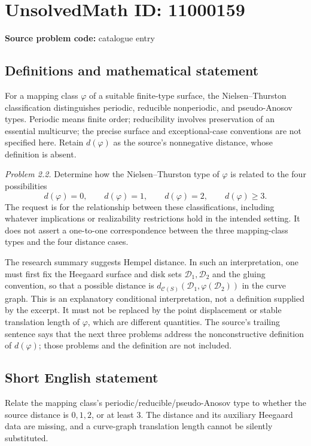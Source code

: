 \documentclass[11pt]{article}
\begin{document}
\section*{UnsolvedMath ID: 11000159}
\textbf{Source problem code:} catalogue entry
\subsection{Definitions and mathematical statement}
For a mapping class \(\varphi\) of a suitable finite-type surface, the Nielsen--Thurston classification distinguishes periodic, reducible nonperiodic, and pseudo-Anosov types. Periodic means finite order; reducibility involves preservation of an essential multicurve; the precise surface and exceptional-case conventions are not specified here. Retain \(d(\varphi)\) as the source's nonnegative distance, whose definition is absent.

\emph{Problem 2.2.} Determine how the Nielsen--Thurston type of \(\varphi\) is related to the four possibilities
\[
 d(\varphi)=0,\qquad d(\varphi)=1,\qquad
 d(\varphi)=2,\qquad d(\varphi)\geq3.
\]
The request is for the relationship between these classifications, including whatever implications or realizability restrictions hold in the intended setting. It does not assert a one-to-one correspondence between the three mapping-class types and the four distance cases.

The research summary suggests Hempel distance. In such an interpretation, one must first fix the Heegaard surface and disk sets \(\mathcal D_1,\mathcal D_2\) and the gluing convention, so that a possible distance is \(d_{\mathcal C(S)}(\mathcal D_1,\varphi(\mathcal D_2))\) in the curve graph. This is an explanatory conditional interpretation, not a definition supplied by the excerpt. It must not be replaced by the point displacement or stable translation length of \(\varphi\), which are different quantities. The source's trailing sentence says that the next three problems address the nonconstructive definition of \(d(\varphi)\); those problems and the definition are not included.
\subsection{Short English statement}
Relate the mapping class's periodic/reducible/pseudo-Anosov type to whether the source distance is \(0,1,2\), or at least \(3\). The distance and its auxiliary Heegaard data are missing, and a curve-graph translation length cannot be silently substituted.
\end{document}
